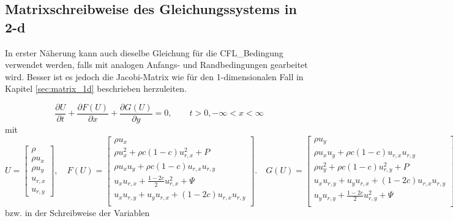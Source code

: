 \subsection{Matrixschreibweise des Gleichungssystems in 2-d}

In erster Näherung kann auch dieselbe Gleichung für die CFL\_Bedingung
verwendet werden, falls mit analogen Anfangs- und Randbedingungen
gearbeitet wird. Besser ist es jedoch die Jacobi-Matrix wie für den
1-dimensionalen Fall in Kapitel \ref{sec:matrix_1d} beschrieben
herzuleiten.

\begin{equation}
  \frac{\partial U}{\partial t} + \frac{\partial F(U)}{\partial x}
  + \frac{\partial G(U)}{\partial y}=
0,\qquad t > 0, -\infty < x < \infty
\end{equation}
mit
\[
U = \left[\begin{array}{c}\rho \\ \rho u_x \\ \rho u_y \\ u_{r,x}
      \\ u_{r,y} \end{array}\right],
\quad 
%
F(U) = \left[\begin{array}{c}
    \rho u_x \\[2mm]
    \rho u_x^2 + \rho c (1-c) u_{r,x}^2 + P  \\[2mm]
    \rho u_x u_y + \rho c(1-c) u_{r,x} u_{r,y}\\[2mm]
    u_x u_{r,x} + \frac{1-2c}{2} u_{r,x}^2 + \Psi\\[2mm]
    u_x u_{r,y} + u_y u_{r,x} + (1-2c)u_{r,x} u_{r,y}\\[2mm]
  \end{array}\right]. 
\quad
G(U) = \left[\begin{array}{c}
    \rho u_y \\[2mm]
    \rho u_x u_y + \rho c(1-c) u_{r,x} u_{r,y}\\[2mm]
    \rho u_y^2 + \rho c (1-c) u_{r,y}^2 + P\\[2mm]
    u_x u_{r,y} + u_y u_{r,x} + (1-2c)u_{r,x} u_{r,y}\\[2mm]
    u_y u_{r,y} + \frac{1-2c}{2} u_{r,y}^2 + \Psi\\[2mm]
  \end{array}\right]. 
\]
bzw. in der Schreibweise der Variablen
